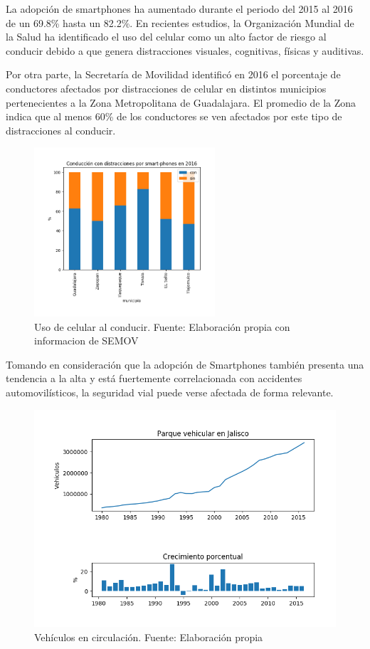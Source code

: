 \documentclass{article}
\begin{document}
La adopción de smartphones ha aumentado durante el periodo del 2015 al 2016 de un
69.8\% hasta un 82.2\%. En recientes estudios, la Organización Mundial de la Salud ha identificado
el uso del celular como un alto factor de riesgo al conducir debido a que genera distracciones
visuales, cognitivas, físicas y auditivas.

Por otra parte, la Secretaría de Movilidad identificó en 2016 el porcentaje de conductores afectados
por distracciones de celular en distintos municipios pertenecientes a la Zona Metropolitana de Guadalajara.
El promedio de la Zona indica que al menos 60\% de los conductores se ven afectados por este tipo
de distracciones al conducir.

	\begin{figure}[H]\centering
	\includegraphics[width=0.6\textwidth]{resources/img/manejo_con_celular.png}
	\caption{\label{fig:manejo_celular} Uso de celular al conducir. Fuente: Elaboración propia con informacion de SEMOV}
    \end{figure}

Tomando en consideración que la adopción de Smartphones
también presenta una tendencia a la alta y está fuertemente correlacionada con accidentes automovilísticos,
la seguridad vial puede verse afectada de forma relevante.

	\begin{figure}[H]\centering
	\includegraphics[width=1\textwidth]{resources/img/parque_vehicular.png}
	\caption{\label{fig:parque_vehicular} Vehículos en circulación. Fuente: Elaboración propia}
    \end{figure}
\end{document}
